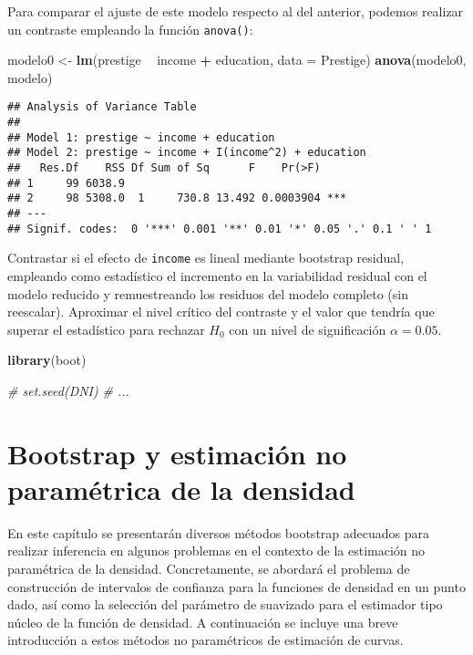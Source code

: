 \documentclass[
]{book}
\newenvironment{Shaded}{\begin{snugshade}}{\end{snugshade}}
\newcommand{\CommentTok}[1]{\textcolor[rgb]{0.56,0.35,0.01}{\textit{#1}}}
\newcommand{\DataTypeTok}[1]{\textcolor[rgb]{0.13,0.29,0.53}{#1}}
\newcommand{\KeywordTok}[1]{\textcolor[rgb]{0.13,0.29,0.53}{\textbf{#1}}}
\newcommand{\NormalTok}[1]{#1}
\newcommand{\OperatorTok}[1]{\textcolor[rgb]{0.81,0.36,0.00}{\textbf{#1}}}
\newcommand{\StringTok}[1]{\textcolor[rgb]{0.31,0.60,0.02}{#1}}
\theoremstyle{break}
\theoremstyle{definition}
\theoremstyle{definition}
\theoremstyle{definition}
\theoremstyle{remark}
\begin{document}
Para comparar el ajuste de este modelo respecto al del anterior, podemos
realizar un contraste empleando la función \texttt{anova()}:

\begin{Shaded}
\begin{Highlighting}[]
\NormalTok{modelo0 <-}\StringTok{ }\KeywordTok{lm}\NormalTok{(prestige }\OperatorTok{~}\StringTok{ }\NormalTok{income }\OperatorTok{+}\StringTok{ }\NormalTok{education, }\DataTypeTok{data =}\NormalTok{ Prestige)}
\KeywordTok{anova}\NormalTok{(modelo0, modelo)}
\end{Highlighting}
\end{Shaded}

\begin{verbatim}
## Analysis of Variance Table
## 
## Model 1: prestige ~ income + education
## Model 2: prestige ~ income + I(income^2) + education
##   Res.Df    RSS Df Sum of Sq      F    Pr(>F)    
## 1     99 6038.9                                  
## 2     98 5308.0  1     730.8 13.492 0.0003904 ***
## ---
## Signif. codes:  0 '***' 0.001 '**' 0.01 '*' 0.05 '.' 0.1 ' ' 1
\end{verbatim}

Contrastar si el efecto de \texttt{income} es lineal mediante bootstrap residual,
empleando como estadístico el incremento en la variabilidad residual con el
modelo reducido y remuestreando los residuos del modelo completo (sin reescalar).
Aproximar el nivel crítico del contraste y el valor que tendría que superar el
estadístico para rechazar \(H_0\) con un nivel de significación \(\alpha = 0.05\).

\begin{Shaded}
\begin{Highlighting}[]
\KeywordTok{library}\NormalTok{(boot)}

\CommentTok{# set.seed(DNI)}
\CommentTok{# ...}
\end{Highlighting}
\end{Shaded}

\hypertarget{npden}{%
\chapter{Bootstrap y estimación no paramétrica de la densidad}\label{npden}}

En este capítulo se presentarán diversos métodos bootstrap adecuados
para realizar inferencia en algunos problemas en el contexto de la
estimación no paramétrica de la densidad. Concretamente, se abordará el
problema de construcción de intervalos de confianza para la funciones de
densidad en un punto dado, así como la selección del parámetro de
suavizado para el estimador tipo núcleo de la función de densidad. A
continuación se incluye una breve introducción a estos métodos no
paramétricos de estimación de curvas.
\end{document}

